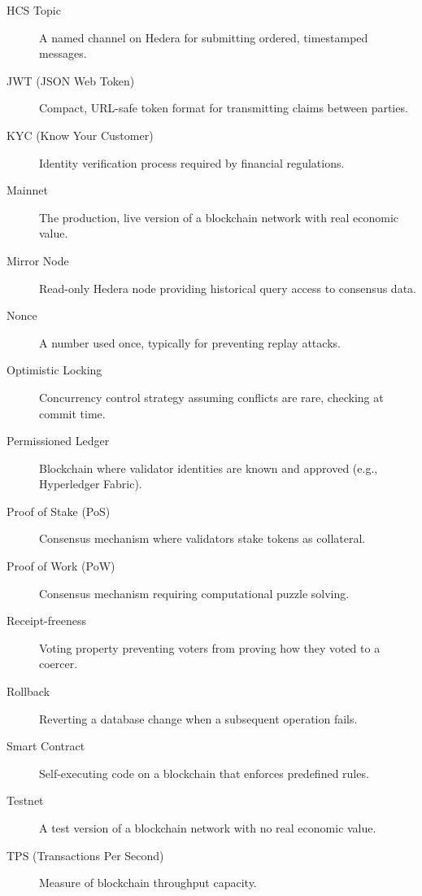 \begin{description}
\item[HCS Topic] A named channel on Hedera for submitting ordered, timestamped messages.

\item[JWT (JSON Web Token)] Compact, URL-safe token format for transmitting claims between parties.

\item[KYC (Know Your Customer)] Identity verification process required by financial regulations.

\item[Mainnet] The production, live version of a blockchain network with real economic value.

\item[Mirror Node] Read-only Hedera node providing historical query access to consensus data.

\item[Nonce] A number used once, typically for preventing replay attacks.

\item[Optimistic Locking] Concurrency control strategy assuming conflicts are rare, checking at commit time.

\item[Permissioned Ledger] Blockchain where validator identities are known and approved (e.g., Hyperledger Fabric).

\item[Proof of Stake (PoS)] Consensus mechanism where validators stake tokens as collateral.

\item[Proof of Work (PoW)] Consensus mechanism requiring computational puzzle solving.

\item[Receipt-freeness] Voting property preventing voters from proving how they voted to a coercer.

\item[Rollback] Reverting a database change when a subsequent operation fails.

\item[Smart Contract] Self-executing code on a blockchain that enforces predefined rules.

\item[Testnet] A test version of a blockchain network with no real economic value.

\item[TPS (Transactions Per Second)] Measure of blockchain throughput capacity.


\end{description}
